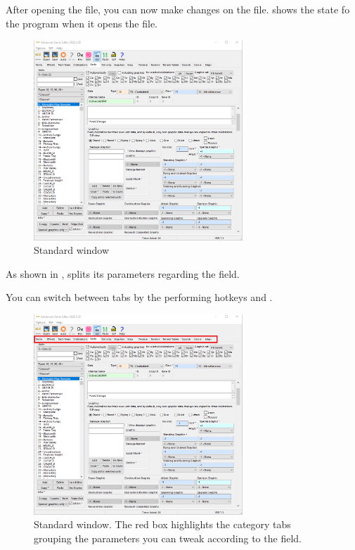 \begin{appendices}
    After opening the file, you can now make changes on the file.  shows the state fo the program when it opens the file. 

    \begin{figure}[ht]
        \centering
        \includegraphics[width=0.7\textwidth]{src/images/genie01}
        \caption{Standard \genie{} window}
        \label{fig:genie01}
    \end{figure}

    As shown in , \genie{} splits its parameters regarding the \aoe{} field.

    \begin{info}
        You can switch between tabs by the performing hotkeys  and .
    \end{info}

    \begin{figure}[ht]
        \centering
        \includegraphics[width=0.7\textwidth]{src/images/genie03}
        \caption{Standard \genie{} window. The red box highlights the category tabs grouping the parameters you can tweak according to the \aoe{} field.}
        \label{fig:genie03}
    \end{figure}


\end{appendices}
